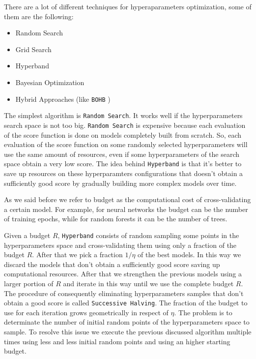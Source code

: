 \documentclass[11pt, a4paper]{article}
\begin{document}
  There are a lot of different techniques for hyperaparameters optimization, some of them are the following:
  \begin{itemize}
    \item Random Search
    \item Grid Search
    \item Hyperband
    \item Bayesian Optimization
    \item Hybrid Approaches (like \texttt{BOHB} \cite{bohb})
  \end{itemize}

  The simplest algorithm is \texttt{Random Search}. It works well if the hyperparameters search space is not too big. \texttt{Random Search} is expensive because each evaluation of the score function is done on models completely built from scratch. So, each evaluation of the score function on some randomly selected hyperparameters will use the same amount of resources, even if some hyperparameters of the search space obtain a very low score. The idea behind \texttt{Hyperband} is that it's better to save up resources on these hyperparamters configurations that doesn't obtain a sufficiently good score by gradually building more complex models over time.
  
  As we said before we refer to budget as the computational cost of cross-validating a certain model. For example, for neural networks the budget can be the number of training epochs, while for random forests it can be the number of trees.

  Given a budget $R$, \texttt{Hyperband} consists of random sampling some points in the hyperparameters space and cross-validating them using only a fraction of the budget $R$. After that we pick a fraction $1/\eta$ of the best models. In this way we discard the models that don't obtain a sufficiently good score saving up computational resources. After that we strengthen the previous models using a larger portion of $R$ and iterate in this way until we use the complete budget $R$. The procedure of consequently eliminating hyperparameters samples that don't obtain a good score is called \texttt{Successive Halving}. The fraction of the budget to use for each iteration grows geometrically in respect of $\eta$. The problem is to determinate the number of initial random points of the hyperparameters space to sample. To resolve this issue we execute the previous discussed algorithm multiple times using less and less initial random points and using an higher starting budget.
\end{document}
